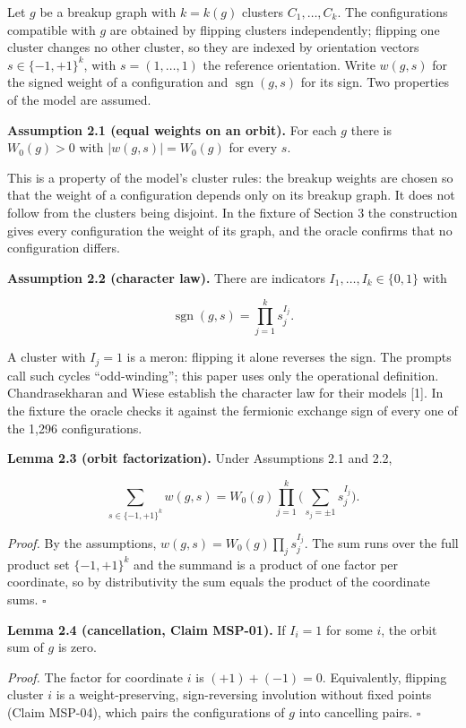 \documentclass[
  11pt,
]{article}
\begin{document}
Let \(g\) be a breakup graph with \(k = k(g)\) clusters
\(C_1, \dots, C_k\). The configurations compatible with \(g\) are
obtained by flipping clusters independently; flipping one cluster
changes no other cluster, so they are indexed by orientation vectors
\(s \in \{-1, +1\}^k\), with \(s = (1, \dots, 1)\) the reference
orientation. Write \(w(g, s)\) for the signed weight of a configuration
and \(\operatorname{sgn}(g, s)\) for its sign. Two properties of the
model are assumed.

\textbf{Assumption 2.1 (equal weights on an orbit).} For each \(g\)
there is \(W_0(g) > 0\) with \(|w(g, s)| = W_0(g)\) for every \(s\).

This is a property of the model's cluster rules: the breakup weights are
chosen so that the weight of a configuration depends only on its breakup
graph. It does not follow from the clusters being disjoint. In the
fixture of Section 3 the construction gives every configuration the
weight of its graph, and the oracle confirms that no configuration
differs.

\textbf{Assumption 2.2 (character law).} There are indicators
\(I_1, \dots, I_k \in \{0, 1\}\) with

\[\operatorname{sgn}(g, s) = \prod_{j=1}^{k} s_j^{I_j}.\]

A cluster with \(I_j = 1\) is a meron: flipping it alone reverses the
sign. The prompts call such cycles ``odd-winding''; this paper uses only
the operational definition. Chandrasekharan and Wiese establish the
character law for their models {[}1{]}. In the fixture the oracle checks
it against the fermionic exchange sign of every one of the 1,296
configurations.

\textbf{Lemma 2.3 (orbit factorization).} Under Assumptions 2.1 and 2.2,

\[\sum_{s \in \{-1,+1\}^k} w(g, s) = W_0(g) \prod_{j=1}^{k} \Big( \sum_{s_j = \pm 1} s_j^{I_j} \Big).\]

\emph{Proof.} By the assumptions,
\(w(g, s) = W_0(g) \prod_j s_j^{I_j}\). The sum runs over the full
product set \(\{-1, +1\}^k\) and the summand is a product of one factor
per coordinate, so by distributivity the sum equals the product of the
coordinate sums. \(\square\)

\textbf{Lemma 2.4 (cancellation, Claim MSP-01).} If \(I_i = 1\) for some
\(i\), the orbit sum of \(g\) is zero.

\emph{Proof.} The factor for coordinate \(i\) is \((+1) + (-1) = 0\).
Equivalently, flipping cluster \(i\) is a weight-preserving,
sign-reversing involution without fixed points (Claim MSP-04), which
pairs the configurations of \(g\) into cancelling pairs. \(\square\)
\end{document}
